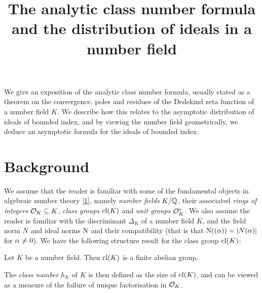 \documentclass[11pt]{report}
\title{The analytic class number formula and the distribution of ideals in a number field}
\begin{document}
\maketitle
\abstract

We give an exposition of the analytic class number formula, usually stated as a theorem on the convergence, poles and residues of the Dedekind zeta function of a number field $K$. We describe how this relates to the asymptotic distribution of ideals of bounded index, and by viewing the number field geometrically, we deduce an asymptotic formula for the ideals of bounded index.

\tableofcontents
\chapter{Background} %
We assume that the reader is familiar with some of the fundamental objects in algebraic number theory \hyperlink{stevenhagen}{[1]}, namely \emph{number fields} $K / \mathbb{Q}$, their associated \emph{rings of integers} $\mathcal{O}_K \subseteq K$, \emph{class groups} $\operatorname{cl}(K)$ and \emph{unit groups} $\mathcal{O}_K^*$. We also assume the reader is familiar with the discriminant $\Delta_K$ of a number field $K$, and the field norm $N$ and ideal norms $\operatorname{N}$ and their compatibility (that is that $\operatorname{N}((\alpha)) = \left| N(\alpha) \right|$ for $\alpha \neq 0$). We have the following structure result for the class group $\operatorname{cl}(K)$:
\begin{theorem}
    Let $K$ be a number field. Then $\operatorname{cl}(K)$ is a finite abelian group.
\end{theorem}
The \emph{class number} $h_K$ of $K$ is then defined as the size of $\operatorname{cl}(K)$, and can be viewed as a measure of the failure of unique factorisation in $\mathcal{O}_K$.
\end{document}
